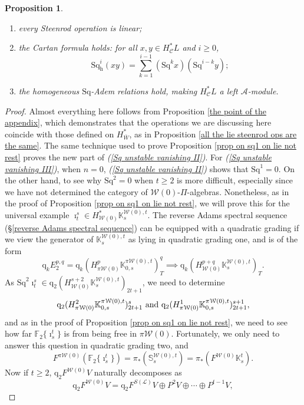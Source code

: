 \documentclass[11pt]{amsart} \renewcommand{\baselinestretch}{1.2}
\theoremstyle{plain}
\newtheorem{prop}[thm]{Proposition}
\numberwithin{equation}{section} %
\theoremstyle{plain}
\newtheorem{prop}[thm]{Proposition}
\numberwithin{equation}{chapter} %
\newcommand{\scrL}{\mathscr{L}}
\newcommand{\calA}{\mathcal{A}}
\newcommand{\calw}{\mathcal{W}}
\newcommand{\calc}{\mathcal{C}}
\newcommand{\LieOperad}{{\scrL}}
\newcommand{\PA}[1]{\pi#1}
\newcommand{\quadgrad}[1]{\mathrm{q}_{#1}}
\newcommand{\Sq}{\mathrm{Sq}}
\newcommand{\LieSteen}{\calA}
\newcommand{\F}{\mathbb{F}}
\newcommand{\Ftwo}{\F_2}
\newcommand{\dhor}{_\mathrm{h}}
\newcommand{\Sqh}{\mathrm{Sq}\dhor}
\begin{document}
\begin{Cohomology Operations for W and U}
\begin{prop}
\begin{enumerate}
\item every Steenrod operation is linear;
\item the \emph{Cartan formula} holds:  for all $x,y\in   H^*_{\calc}L$ and $i\geq0$,
\[\Sqh^i(xy)=\textstyle\sum_{k=1}^{i-1}(\Sq^kx)(\Sq^{i-k}y);\]
\item \label{yeah H is a Stmodule II} the  homogeneous $\Sq$-Adem relations hold, making $H^{*}_\calc L$ a left $\LieSteen$-module.
\end{enumerate}
\end{prop}
\begin{proof}
Almost everything here follows from Proposition \ref{the point of the appendix}, which demonstrates that the operations we are discussing here coincide with those defined on $H^*_{\bar{W}}$, as in Proposition \ref{all the lie steenrod ops are the same}. The same technique used to prove Proposition \ref{prop on sq1 on lie not rest} proves the new part of \emph{(\ref{Sq unstable vanishing II})}. For \emph{(\ref{Sq unstable vanishing III})},  when $n=0$, \emph{(\ref{Sq unstable vanishing II})} shows that $\Sq^1=0$. On the other hand, to see why $\Sq^2=0$ when $t\geq2$ is more difficult, especially since we have not determined the category of $\calw(0)$-$\Pi$-algebras. Nonetheless, as in the proof of Proposition \ref{prop on sq1 on lie not rest}, we will prove this for the universal example $\imath^s_t\in H^*_{\calw(0)}\mathbb{K}_s^{\calw(0),t}$. The reverse Adams spectral sequence (\S\ref{reverse Adams spectral sequence}) can be equipped with a quadratic grading if we view the generator of $\mathbb{K}_s^{\calw(0),t}$ as lying in quadratic grading one, and is of the form
\[\quadgrad{k}E_2^{p,q}=\quadgrad{k}(H^{p}_{\PA{\calw(0)}}\mathbb{K}_{0,s}^{\PA{\calw(0)},t})^{q}_{T}\implies \quadgrad{k}(H^{p+q}_{\calw(0)}\mathbb{K}_s^{\calw(0),t})_T.\]
As $\Sq^2\imath_t^s\in \quadgrad{2}(H^{s+2}_{\calw(0)}\mathbb{K}_s^{\calw(0),t})_{2t+1}$, we need to determine
\[
\quadgrad{2}(H^{2}_{\PA{\calw(0)}}\mathbb{K}_{0,s}^{\PA{\calw(0)},t})^{s}_{2t+1}\textup{ and }
\quadgrad{2}(H^{1}_{\PA{\calw(0)}}\mathbb{K}_{0,s}^{\PA{\calw(0)},t})^{s+1}_{2t+1},
\] 
and as in the proof of Proposition \ref{prop on sq1 on lie not rest}, we need to see how far $\Ftwo\{\imath^t_s\}$ is from being free in $\PA{\calw(0)}$. Fortunately, we only need to answer this question in quadratic grading two, and 
\[F^{\PA{\calw(0)}}(\Ftwo\{\imath^t_s\})=\pi_*(\mathbb{S}_s^{\calw(0),t})=\pi_*(F^{\calw(0)} \mathbb{K}^{t}_s).\]
Now if $t\geq2$, $\quadgrad{2}F^{\calw(0)}V$ naturally decomposes as 
\[\quadgrad{2}F^{\calw(0)}V=\quadgrad{2}F^{S(\LieOperad)}V\oplus P^2V\oplus\cdots \oplus P^{t-1}V,\]

\end{proof}
\end{Cohomology Operations for W and U}
\end{document}
